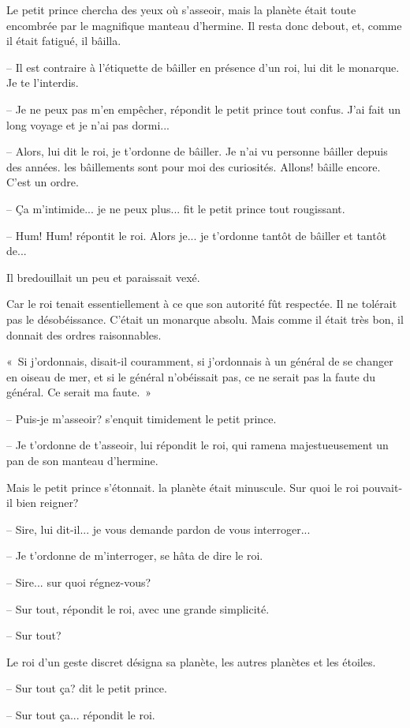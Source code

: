 \documentclass[a4paper]{report}
\begin{document}
Le petit prince chercha des yeux où s'asseoir, mais la planète était toute encombrée par le magnifique manteau d'hermine. Il resta donc debout, et, comme il était fatigué, il bâilla.

-- Il est contraire à l'étiquette de bâiller en présence d'un roi, lui dit le monarque. Je te l'interdis.

-- Je ne peux pas m'en empêcher, répondit le petit prince tout confus. J'ai fait un long voyage et je n'ai pas dormi...

-- Alors, lui dit le roi, je t'ordonne de bâiller. Je n'ai vu personne bâiller depuis des années. les bâillements sont pour moi des curiosités. Allons! bâille encore. C'est un ordre.

-- Ça m'intimide... je ne peux plus... fit le petit prince tout rougissant.

-- Hum! Hum! répontit le roi. Alors je... je t'ordonne tantôt de bâiller et tantôt de...

Il bredouillait un peu et paraissait vexé.

Car le roi tenait essentiellement à ce que son autorité fût respectée. Il ne tolérait pas le désobéissance. C'était un monarque absolu. Mais comme il était très bon, il donnait des ordres raisonnables.

«~Si j'ordonnais, disait-il couramment, si j'ordonnais à un général de se changer en oiseau de mer, et si le général n'obéissait pas, ce ne serait pas la faute du général. Ce serait ma faute.~»

-- Puis-je m'asseoir? s'enquit timidement le petit prince.

-- Je t'ordonne de t'asseoir, lui répondit le roi, qui ramena majestueusement un pan de son manteau d'hermine.

Mais le petit prince s'étonnait. la planète était minuscule. Sur quoi le roi pouvait-il bien reigner?

-- Sire, lui dit-il... je vous demande pardon de vous interroger...

-- Je t'ordonne de m'interroger, se hâta de dire le roi.

-- Sire... sur quoi régnez-vous?

-- Sur tout, répondit le roi, avec une grande simplicité.

-- Sur tout?

Le roi d'un geste discret désigna sa planète, les autres planètes et les étoiles.

-- Sur tout ça? dit le petit prince.

-- Sur tout ça... répondit le roi.
\end{document}
